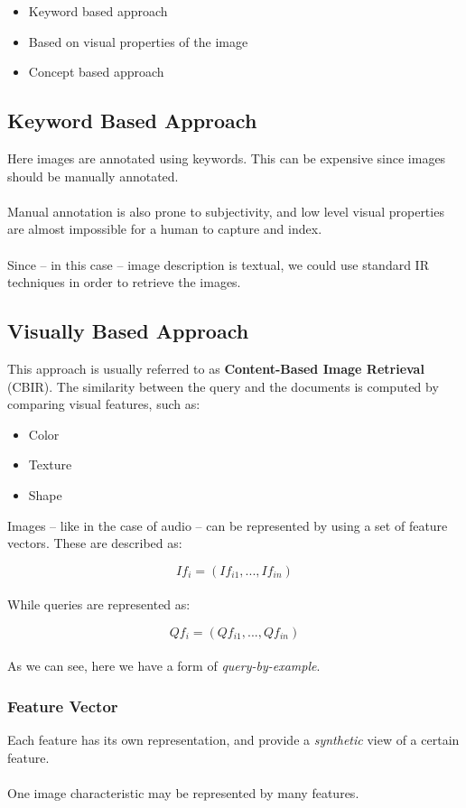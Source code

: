\documentclass{article}
\begin{document}
\begin{itemize}
	\item Keyword based approach
	\item Based on visual properties of the image
	\item Concept based approach
\end{itemize}

\subsection{Keyword Based Approach}
Here images are annotated using keywords. This can be expensive since images should be manually annotated. \\ \\
Manual annotation is also prone to subjectivity, and low level visual properties are almost impossible for a human to capture and index. \\ \\
Since -- in this case -- image description is textual, we could use standard IR techniques in order to retrieve the images.

\subsection{Visually Based Approach}
This approach is usually referred to as \textbf{Content-Based Image Retrieval} (CBIR). The similarity between the query and the documents is computed by comparing visual features, such as:

\begin{itemize}
	\item Color
	\item Texture
	\item Shape
\end{itemize}
Images -- like in the case of audio -- can be represented by using a set of feature vectors. These are described as:

\[ If_i = (If_{i1}, ..., If_{in}) \] \\
While queries are represented as:

\[ Qf_i = (Qf_{i1}, ..., Qf_{in}) \] \\
As we can see, here we have a form of \textit{query-by-example}.

\subsubsection{Feature Vector}
Each feature has its own representation, and provide a \textit{synthetic} view of a certain feature. \\ \\
One image characteristic may be represented by many features.
\end{document}
